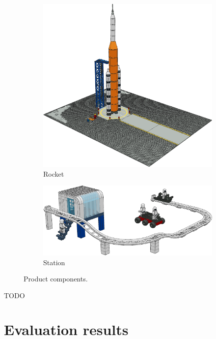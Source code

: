 \documentclass{PDS}
\begin{document}
\begin{figure}[htbp]
    \begin{subfigure}[b]{0.3\textwidth}
        \includegraphics[width=\textwidth]{./figures/space_rocket.png}
        \caption{Rocket}
    \end{subfigure}
    \hfill
    \begin{subfigure}[b]{0.65\textwidth}
        \includegraphics[width=\textwidth]{./figures/space_station.png}
        \caption{Station}
    \end{subfigure}
    \caption{Product components.}
\end{figure}

TODO

\section{Evaluation results}
\label{sec:discussion}
\end{document}
